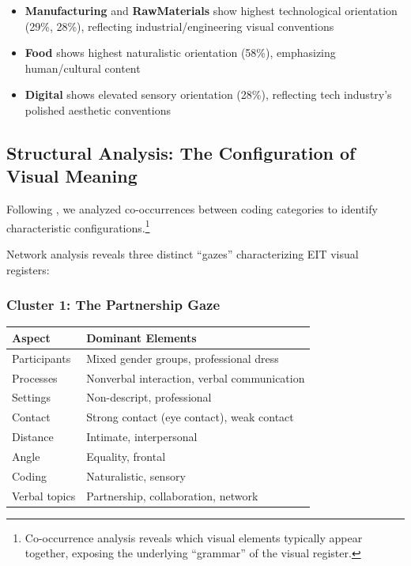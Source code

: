\documentclass[../main.tex]{subfiles}
\begin{document}
\begin{itemize}
    \item \textbf{Manufacturing} and \textbf{RawMaterials} show highest technological orientation (29\%, 28\%), reflecting industrial/engineering visual conventions
    \item \textbf{Food} shows highest naturalistic orientation (58\%), emphasizing human/cultural content
    \item \textbf{Digital} shows elevated sensory orientation (28\%), reflecting tech industry's polished aesthetic conventions
\end{itemize}

\subsection{Structural Analysis: The Configuration of Visual Meaning}

Following \cite{hollerer2013imageries}, we analyzed co-occurrences between coding categories to identify characteristic configurations.\footnote{Co-occurrence analysis reveals which visual elements typically appear together, exposing the underlying ``grammar'' of the visual register.}

Network analysis reveals three distinct ``gazes'' characterizing EIT visual registers:

\subsubsection{Cluster 1: The Partnership Gaze}

\begin{center}
\small
\begin{tabular}{ll}
\toprule
\textbf{Aspect} & \textbf{Dominant Elements} \\
\midrule
Participants & Mixed gender groups, professional dress \\
Processes & Nonverbal interaction, verbal communication \\
Settings & Non-descript, professional \\
Contact & Strong contact (eye contact), weak contact \\
Distance & Intimate, interpersonal \\
Angle & Equality, frontal \\
Coding & Naturalistic, sensory \\
Verbal topics & Partnership, collaboration, network \\
\bottomrule
\end{tabular}
\end{center}
\end{document}
